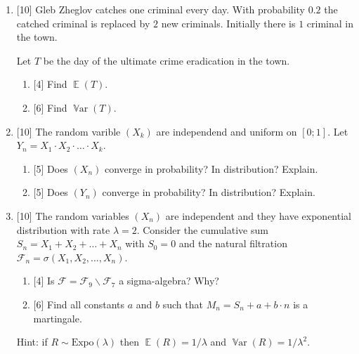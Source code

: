 \documentclass[12pt]{article}
\DeclareMathOperator{\Var}{\mathbb{V}ar}
\DeclareMathOperator{\E}{\mathbb{E}}
\newcommand{\cF}{\mathcal{F}}
\newcommand{\dExpo}{\mathrm{Expo}}
\begin{document}
\begin{enumerate}
    \item {[10]} Gleb Zheglov catches one criminal every day. 
    With probability $0.2$ the catched criminal is replaced by $2$ new criminals. 
    Initially there is $1$ criminal in the town. 
    
    Let $T$ be the day of the ultimate crime eradication in the town. 
    
    \begin{enumerate}
      \item {[4]} Find $\E(T)$.
      \item {[6]} Find $\Var(T)$.
    \end{enumerate}

    \item {[10]} The random varible $(X_k)$ are independend and uniform on $[0;1]$.
    Let $Y_n = X_1 \cdot X_2 \cdot \dots \cdot X_k$.
    \begin{enumerate}
        \item {[5]} Does $(X_n)$ converge in probability? In distribution? Explain. 
        \item {[5]} Does $(Y_n)$ converge in probability? In distribution? Explain.
    \end{enumerate}
    
    \item {[10]} The random variables $(X_n)$ are independent and they have exponential distribution with rate $\lambda = 2$. 
    Consider the cumulative sum $S_n = X_1 + X_2 + \dots + X_n$ with $S_0 = 0$
    and the natural filtration $\cF_n = \sigma(X_1, X_2, \dots, X_n)$.

    \begin{enumerate}
        \item {[4]} Is $\cF = \cF_9 \backslash \cF_7$ a sigma-algebra? Why?
        \item {[6]} Find all constants $a$ and $b$ such that $M_n = S_n + a + b \cdot n$ is a martingale. 
    \end{enumerate}

    Hint: if $R \sim \dExpo(\lambda)$ then $\E(R) = 1/\lambda$ and $\Var(R) = 1/\lambda^2$. 

\end{enumerate}
\end{document}
